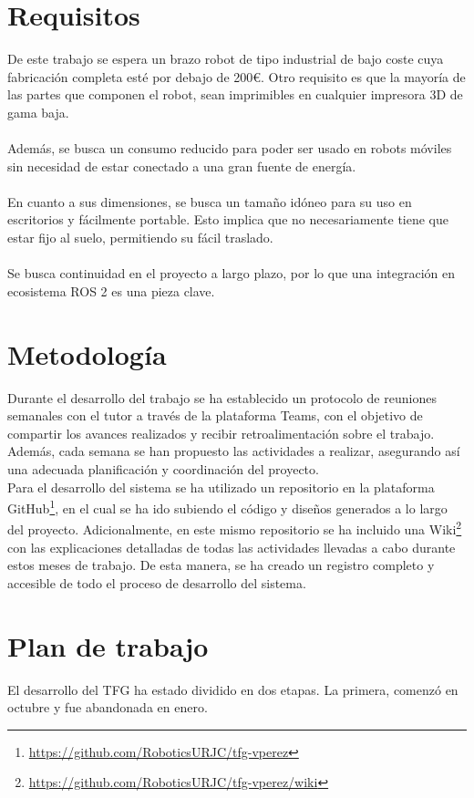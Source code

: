 \section{Requisitos}
\label{sec:requisitos}
De este trabajo se espera un brazo robot de tipo industrial de bajo coste cuya fabricación completa esté por debajo de 200\euro.
Otro requisito es que la mayoría de las partes que componen el robot, sean imprimibles en cualquier impresora 3D de gama baja.\\\\
Además, se busca un consumo reducido para poder ser usado en robots móviles sin necesidad de estar conectado a una gran fuente de 
energía.\\\\
En cuanto a sus dimensiones, se busca un tamaño idóneo para su uso en escritorios y fácilmente portable. Esto implica que no necesariamente 
tiene que estar fijo al suelo, permitiendo su fácil traslado.\\\\
Se busca continuidad en el proyecto a largo plazo, por lo que una integración en ecosistema ROS 2 es una pieza clave. 

\section{Metodología}
\label{sec:metodologia}

Durante el desarrollo del trabajo se ha establecido un protocolo de reuniones semanales con el tutor a 
través de la plataforma Teams, con el objetivo de compartir los avances realizados y recibir retroalimentación 
sobre el trabajo. Además, cada semana se han propuesto las actividades a realizar, asegurando así una adecuada 
planificación y coordinación del proyecto. \\
Para el desarrollo del sistema se ha utilizado un repositorio en la plataforma GitHub\footnote{\url{https://github.com/RoboticsURJC/tfg-vperez}}, en el cual se ha ido
subiendo el código y diseños generados a lo largo del proyecto. Adicionalmente, en este mismo repositorio 
se ha incluido una Wiki\footnote{\url{https://github.com/RoboticsURJC/tfg-vperez/wiki}} con las explicaciones detalladas de todas las actividades llevadas a cabo durante estos 
meses de trabajo. De esta manera, se ha creado un registro completo y accesible de todo el proceso de desarrollo del sistema.

\section{Plan de trabajo}
\label{sec:plantrabajo}
El desarrollo del TFG ha estado dividido en dos etapas. La primera, comenzó en octubre y fue abandonada en enero. 